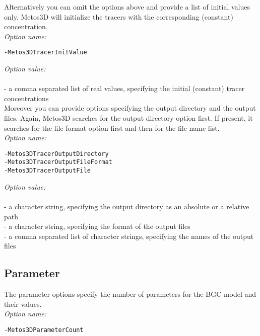 \documentclass{article}
\begin{document}
Alternatively you can omit the options above and provide a list of initial values only.
Metos3D will initialize the tracers with the corresponding (constant) concentration. \\

\emph{Option name:}
\begin{verbatim}
-Metos3DTracerInitValue
\end{verbatim}

\emph{Option value:} \\
\vspace{-0.3cm}\\
- a comma separated list of real values, specifying the initial (constant) tracer concentrations \\

Moreover you can provide options specifying the output directory and the output files.
Again, Metos3D searches for the output directory option first. If present,
it searches for the file format option first and then for the file name list. \\

\emph{Option name:}
\begin{verbatim}
-Metos3DTracerOutputDirectory
-Metos3DTracerOutputFileFormat
-Metos3DTracerOutputFile
\end{verbatim}

\emph{Option value:} \\
\vspace{-0.3cm}\\
- a character string, specifying the output directory as an absolute or a relative path \\
- a character string, specifying the format of the output files \\
- a comma separated list of character strings, specifying the names of the output files \\

%
%
\subsection{Parameter}

The parameter options specify the number of parameters for the BGC model
and their values. \\

\emph{Option name:}
\begin{verbatim}
-Metos3DParameterCount
\end{verbatim}
\end{document}

